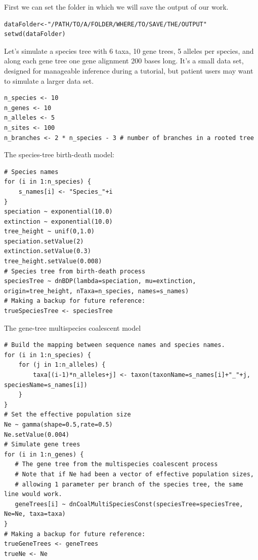 \documentclass[11pt]{article}
\begin{document}
{\begin{framed}
First we can set the folder in which we will save the output of our work.
 {\tt \begin{snugshade*}
\begin{lstlisting}
dataFolder<-"/PATH/TO/A/FOLDER/WHERE/TO/SAVE/THE/OUTPUT"
setwd(dataFolder)
\end{lstlisting}
\end{snugshade*}}

Let's simulate a species tree with 6 taxa, 10 gene trees, 5 alleles per species, and along each gene tree one gene alignment 200 bases long.
It's a small data set, designed for manageable inference during a tutorial, but patient users may want to simulate a larger data set.

 {\tt \begin{snugshade*}
\begin{lstlisting}
n_species <- 10
n_genes <- 10
n_alleles <- 5
n_sites <- 100
n_branches <- 2 * n_species - 3 # number of branches in a rooted tree
\end{lstlisting}
\end{snugshade*}}

The species-tree birth-death model:

 {\tt \begin{snugshade*}
\begin{lstlisting}
# Species names
for (i in 1:n_species) {
	s_names[i] <- "Species_"+i
}
speciation ~ exponential(10.0)
extinction ~ exponential(10.0)
tree_height ~ unif(0,1.0)
speciation.setValue(2)
extinction.setValue(0.3)
tree_height.setValue(0.008)
# Species tree from birth-death process
speciesTree ~ dnBDP(lambda=speciation, mu=extinction, origin=tree_height, nTaxa=n_species, names=s_names)
# Making a backup for future reference:
trueSpeciesTree <- speciesTree
\end{lstlisting}
\end{snugshade*}}

The gene-tree multispecies coalescent model
 {\tt \begin{snugshade*}
\begin{lstlisting}
# Build the mapping between sequence names and species names.
for (i in 1:n_species) {
	for (j in 1:n_alleles) {
		taxa[(i-1)*n_alleles+j] <- taxon(taxonName=s_names[i]+"_"+j, speciesName=s_names[i])
	}
}
# Set the effective population size
Ne ~ gamma(shape=0.5,rate=0.5)
Ne.setValue(0.004)
# Simulate gene trees
for (i in 1:n_genes) {
   # The gene tree from the multispecies coalescent process
   # Note that if Ne had been a vector of effective population sizes, 
   # allowing 1 parameter per branch of the species tree, the same line would work.
   geneTrees[i] ~ dnCoalMultiSpeciesConst(speciesTree=speciesTree, Ne=Ne, taxa=taxa)
}
# Making a backup for future reference:
trueGeneTrees <- geneTrees
trueNe <- Ne
\end{lstlisting}
\end{snugshade*}}


\end{framed}}
\end{document}
